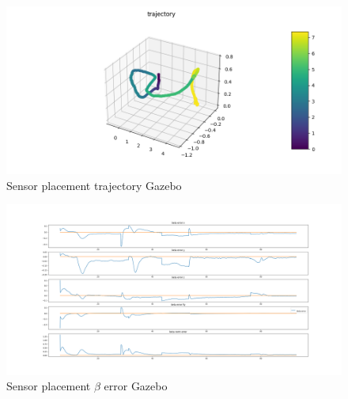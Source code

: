 \begin{figure}[h!]
   \centering
   \includegraphics[width=\linewidth]{Images/gazebo_trajectory_sensor.png}
   \caption{Sensor placement trajectory Gazebo}
   \label{fig:trajgazebosensor}
\end{figure}
\begin{figure}[h!]
   \centering
   \includegraphics[width=\linewidth]{Images/gazebo_betaerror_sensor.png}
   \caption{Sensor placement $\beta$ error Gazebo}
   \label{fig:betaerrorgazebosensor}
\end{figure}

